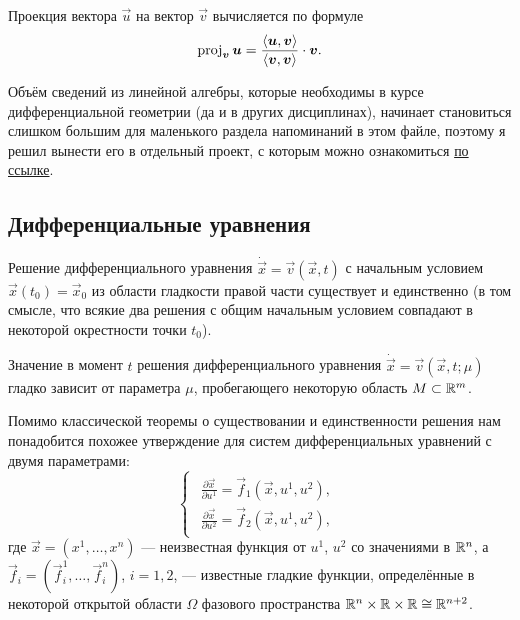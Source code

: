 Проекция вектора $\vec{u}$ на вектор $\vec{v}$ вычисляется по формуле
\[
	\operatorname{proj}_{\boldsymbol{v}}\boldsymbol{u} = \frac{\langle\boldsymbol{u}, \boldsymbol{v}\rangle}{\langle\boldsymbol{v}, \boldsymbol{v}\rangle} \cdot \boldsymbol{v}.
\]

Объём сведений из линейной алгебры, которые необходимы в курсе дифференциальной геометрии (да и в других дисциплинах), начинает становиться слишком большим для маленького раздела напоминаний в этом файле, поэтому я решил вынести его в отдельный проект, с которым можно ознакомиться \href{https://github.com/pshenikita/Linal-Teormin}{по ссылке}.

\subsection{Дифференциальные уравнения}

\begin{theorem}
	Решение дифференциального уравнения $\dot{\vec{x}} = \vec{v}(\vec{x}, t)$ с начальным условием $\vec{x}(t_0) = \vec{x}_0$ из области гладкости правой части существует и единственно (в том смысле, что всякие два решения с общим начальным условием совпадают в некоторой окрестности точки $t_0$).
\end{theorem}

\begin{theorem}
	Значение в момент $t$ решения дифференциального уравнения $\dot{\vec{x}} = \vec{v}(\vec{x}, t; \mu)$ гладко зависит от параметра $\mu$, пробегающего некоторую область $M \subset \mathbb{R}^m$.
\end{theorem}

Помимо классической теоремы о существовании и единственности решения нам понадобится похожее утверждение для систем дифференциальных уравнений с двумя параметрами:
\begin{equation} \label{eq:DiffSystem}
	\begin{cases}
		\begin{aligned}
			\frac{\partial\vec{x}}{\partial u^1} = \vec{f}_1(\vec{x}, u^1, u^2),\\
			\frac{\partial\vec{x}}{\partial u^2} = \vec{f}_2(\vec{x}, u^1, u^2),
		\end{aligned}
	\end{cases}
\end{equation}
где $\vec{x} = (x^1, \ldots, x^n)$ --- неизвестная функция от $u^1$, $u^2$ со значениями в $\mathbb{R}^n$, а $\vec{f}_i = (\vec{f}_i^1, \ldots, \vec{f}_i^n)$, $i = 1, 2$, --- известные гладкие функции, определённые в некоторой открытой области $\Omega$ фазового пространства $\mathbb{R}^n \times \mathbb{R} \times \mathbb{R} \cong \mathbb{R}^{n + 2}$.

